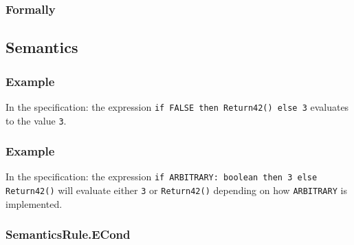 \subsubsection{Formally}
\begin{mathpar}
\end{mathpar}

\subsection{Semantics}
\subsubsection{Example}
In the specification:
the expression \texttt{if FALSE then Return42() else 3} evaluates to the value \texttt{3}.

\subsubsection{Example}
In the specification:
the expression \texttt{if ARBITRARY: boolean then 3 else Return42()} will
evaluate either \texttt{3} or \texttt{Return42()} depending on how
\texttt{ARBITRARY} is implemented.

\subsubsection{SemanticsRule.ECond \label{sec:SemanticsRule.ECond}}
